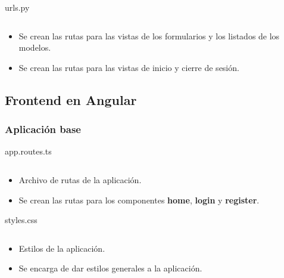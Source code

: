 \documentclass{article}
\newenvironment{block}{\captionsetup{type=listing}}{}
\begin{document}
\begin{block}
	\caption{urls.py}
	\inputminted{Python}{kioskios_api/api/urls.py}
	\begin{itemize}
		\item Se crean las rutas para las vistas de los formularios y los listados de los modelos.
		\item Se crean las rutas para las vistas de inicio y cierre de sesión.
	\end{itemize}
\end{block}
\pagebreak

\subsection{Frontend en Angular}
\subsubsection{Aplicación base}
\begin{block}
	\caption{app.routes.ts}
	\inputminted{TypeScript}{kioskios_web/src/app/app.routes.ts}
	\begin{itemize}
		\item Archivo de rutas de la aplicación.
		\item Se crean las rutas para los componentes \textbf{home}, \textbf{login} y \textbf{register}.
	\end{itemize}

	\caption{styles.css}
	\inputminted{CSS}{kioskios_web/src/styles.css}
	\begin{itemize}
		\item Estilos de la aplicación.
		\item Se encarga de dar estilos generales a la aplicación.
	\end{itemize}
\end{block}
\end{document}
